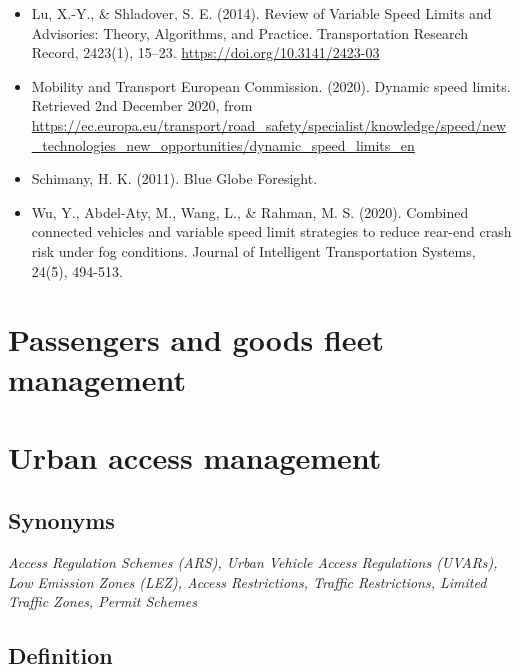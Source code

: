 \documentclass[
]{book}
\begin{document}
\begin{itemize}
\item
  Lu, X.-Y., \& Shladover, S. E. (2014). Review of Variable Speed Limits and Advisories: Theory, Algorithms, and Practice. Transportation Research Record, 2423(1), 15--23. \url{https://doi.org/10.3141/2423-03}
\item
  Mobility and Transport \textbar{} European Commission. (2020). Dynamic speed limits. Retrieved 2nd December 2020, from \url{https://ec.europa.eu/transport/road_safety/specialist/knowledge/speed/new_technologies_new_opportunities/dynamic_speed_limits_en}
\item
  Schimany, H. K. (2011). Blue Globe Foresight.
\item
  Wu, Y., Abdel-Aty, M., Wang, L., \& Rahman, M. S. (2020). Combined connected vehicles and variable speed limit strategies to reduce rear-end crash risk under fog conditions. Journal of Intelligent Transportation Systems, 24(5), 494-513.
\end{itemize}

\hypertarget{passengers-and-goods-fleet-management}{%
\section{Passengers and goods fleet management}\label{passengers-and-goods-fleet-management}}

\hypertarget{urban-access-management}{%
\section{Urban access management}\label{urban-access-management}}

\hypertarget{synonyms-7}{%
\subsection*{Synonyms}\label{synonyms-7}}

\emph{Access Regulation Schemes (ARS), Urban Vehicle Access Regulations (UVARs), Low Emission Zones (LEZ), Access Restrictions, Traffic Restrictions, Limited Traffic Zones, Permit Schemes}

\hypertarget{definition-7}{%
\subsection*{Definition}\label{definition-7}}
\end{document}
